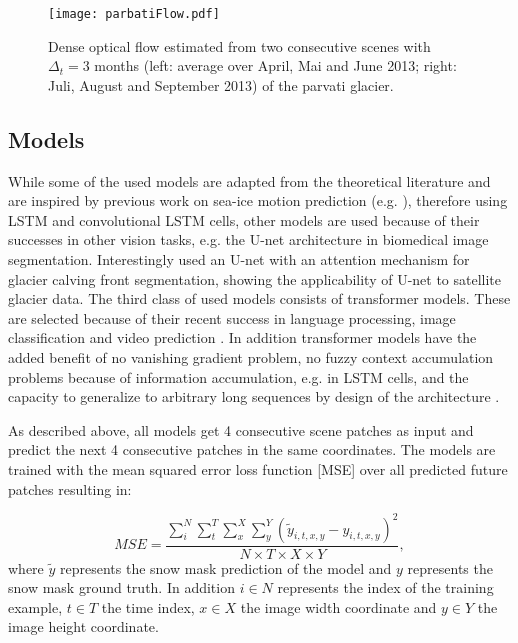 \documentclass[12pt]{article}
\begin{document}
\begin{figure}[H]
	
	\centering
	\texttt{[image: parbatiFlow.pdf]}\hfill
	
	\caption{Dense optical flow estimated from two consecutive scenes with $\Delta_t = 3$ months (left: average over April, Mai and June 2013; right: Juli, August and September 2013) of the parvati glacier.}
	\label{fig:figure3}
	
\end{figure} 

\subsection{Models}
While some of the used models are adapted from the theoretical literature and are inspired by previous work on sea-ice motion prediction (e.g. \citet{petrou2019prediction, petrou2017prediction}), therefore using LSTM and convolutional LSTM cells, other models are used because of their successes in other vision tasks, e.g. the U-net architecture \citep{ronneberger2015u} in biomedical image segmentation. Interestingly \citet{holzmann2021glacier} used an U-net with an attention mechanism for glacier calving front segmentation, showing the applicability of U-net to satellite glacier data. The third class of used models consists of transformer models. These are selected because of their recent success in language processing, image classification and video prediction \citep{khan2022transformers}. In addition transformer models have the added benefit of no vanishing gradient problem, no fuzzy context accumulation problems because of information accumulation, e.g. in LSTM cells, and the capacity to generalize to arbitrary long sequences by design of the architecture \citep{vaswani2017attention}. 

As described above, all models get 4 consecutive scene patches as input and predict the next 4 consecutive patches in the same coordinates. The models are trained with the mean squared error loss function [MSE] over all predicted future patches resulting in:

\begin{equation}
	MSE = \frac{\sum_{i}^{N} \sum_{t}^{T} \sum_{x}^{X} \sum_{y}^{Y} (\tilde{y}_{i, t, x, y} - y_{i, t, x, y})^2}{N \times T \times X \times Y },
\end{equation}
where $\tilde{y}$ represents the snow mask prediction of the model and $y$ represents the snow mask ground truth. In addition $i\in N$ represents the index of the training example, $t \in T$ the time index, $x \in X$ the image width coordinate and $y \in Y $ the image height coordinate.  
\end{document}
